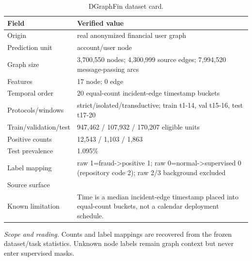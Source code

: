 \begin{table}[tbp]
\centering
\footnotesize
\setlength{\tabcolsep}{3.2pt}
\renewcommand{\arraystretch}{1.12}
\caption{DGraphFin dataset card.}
\label{tab:s-dataset-dgraphfin}
\begin{tabularx}{\textwidth}{@{}>{\raggedright\arraybackslash}p{} Y@{}}
\toprule
\textbf{Field} & \textbf{Verified value} \\
\midrule
Origin & real anonymized financial user graph \\
Prediction unit & account/user node \\
Graph size & 3,700,550 nodes; 4,300,999 source edges; 7,994,520 message-passing arcs \\
Features & 17 node; 0 edge \\
Temporal order & 20 equal-count incident-edge timestamp buckets \\
Protocols/windows & strict/isolated/transductive; train t1-14, val t15-16, test t17-20 \\
Train/validation/test & 947,462 / 107,932 / 170,207 eligible units \\
Positive counts & 12,543 / 1,103 / 1,863 \\
Test prevalence & 1.095\% \\
Label mapping & raw 1=fraud->positive 1; raw 0=normal->supervised 0 (repository code 2); raw 2/3 background excluded \\
Source surface &  \\
Known limitation & Time is a median incident-edge timestamp placed into equal-count buckets, not a calendar deployment schedule. \\
\bottomrule
\end{tabularx}
\vspace{2pt}
\begin{minipage}{\textwidth}\footnotesize\emph{Scope and reading.} Counts and label mappings are recovered from the frozen dataset/task statistics. Unknown node labels remain graph context but never enter supervised masks.\end{minipage}
\end{table}

